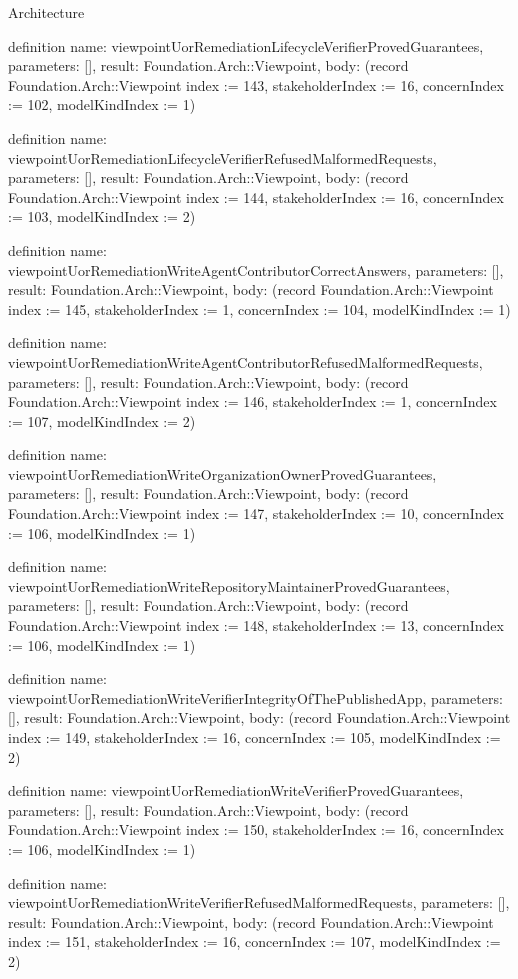 \begin{lexlean}{Architecture}
\begin{semanticmodule}
definition{
  name: viewpointUorRemediationLifecycleVerifierProvedGuarantees,
  parameters: [],
  result: Foundation.Arch::Viewpoint,
  body: (record Foundation.Arch::Viewpoint {index := 143, stakeholderIndex := 16, concernIndex := 102, modelKindIndex := 1})
}

definition{
  name: viewpointUorRemediationLifecycleVerifierRefusedMalformedRequests,
  parameters: [],
  result: Foundation.Arch::Viewpoint,
  body: (record Foundation.Arch::Viewpoint {index := 144, stakeholderIndex := 16, concernIndex := 103, modelKindIndex := 2})
}

definition{
  name: viewpointUorRemediationWriteAgentContributorCorrectAnswers,
  parameters: [],
  result: Foundation.Arch::Viewpoint,
  body: (record Foundation.Arch::Viewpoint {index := 145, stakeholderIndex := 1, concernIndex := 104, modelKindIndex := 1})
}

definition{
  name: viewpointUorRemediationWriteAgentContributorRefusedMalformedRequests,
  parameters: [],
  result: Foundation.Arch::Viewpoint,
  body: (record Foundation.Arch::Viewpoint {index := 146, stakeholderIndex := 1, concernIndex := 107, modelKindIndex := 2})
}

definition{
  name: viewpointUorRemediationWriteOrganizationOwnerProvedGuarantees,
  parameters: [],
  result: Foundation.Arch::Viewpoint,
  body: (record Foundation.Arch::Viewpoint {index := 147, stakeholderIndex := 10, concernIndex := 106, modelKindIndex := 1})
}

definition{
  name: viewpointUorRemediationWriteRepositoryMaintainerProvedGuarantees,
  parameters: [],
  result: Foundation.Arch::Viewpoint,
  body: (record Foundation.Arch::Viewpoint {index := 148, stakeholderIndex := 13, concernIndex := 106, modelKindIndex := 1})
}

definition{
  name: viewpointUorRemediationWriteVerifierIntegrityOfThePublishedApp,
  parameters: [],
  result: Foundation.Arch::Viewpoint,
  body: (record Foundation.Arch::Viewpoint {index := 149, stakeholderIndex := 16, concernIndex := 105, modelKindIndex := 2})
}

definition{
  name: viewpointUorRemediationWriteVerifierProvedGuarantees,
  parameters: [],
  result: Foundation.Arch::Viewpoint,
  body: (record Foundation.Arch::Viewpoint {index := 150, stakeholderIndex := 16, concernIndex := 106, modelKindIndex := 1})
}

definition{
  name: viewpointUorRemediationWriteVerifierRefusedMalformedRequests,
  parameters: [],
  result: Foundation.Arch::Viewpoint,
  body: (record Foundation.Arch::Viewpoint {index := 151, stakeholderIndex := 16, concernIndex := 107, modelKindIndex := 2})
}


\end{semanticmodule}
\end{lexlean}
